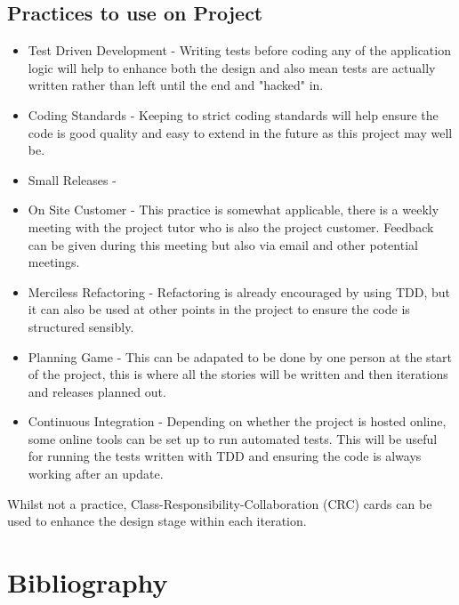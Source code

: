 \documentclass{article}
\begin{document}
\subsection{Practices to use on Project}
\begin{itemize}
	\item Test Driven Development - Writing tests before coding any of the application logic will help to enhance both the design and also mean tests are actually written rather than left until the end and "hacked" in.
	\item Coding Standards - Keeping to strict coding standards will help ensure the code is good quality and easy to extend in the future as this project may well be.
	\item Small Releases - 
	\item On Site Customer - This practice is somewhat applicable, there is a weekly meeting with the project tutor who is also the project customer. Feedback can be given during this meeting but also via email and other potential meetings.
	\item Merciless Refactoring - Refactoring is already encouraged by using TDD, but it can also be used at other points in the project to ensure the code is structured sensibly.
	\item Planning Game - This can be adapated to be done by one person at the start of the project, this is where all the stories will be written and then iterations and releases planned out.
	\item Continuous Integration - Depending on whether the project is hosted online, some online tools can be set up to run automated tests. This will be useful for running the tests written with TDD and ensuring the code is always working after an update.
\end{itemize}
Whilst not a practice, Class-Responsibility-Collaboration (CRC) cards can be used to enhance the design stage within each iteration.
\newpage

\section{Bibliography}
\end{document}
